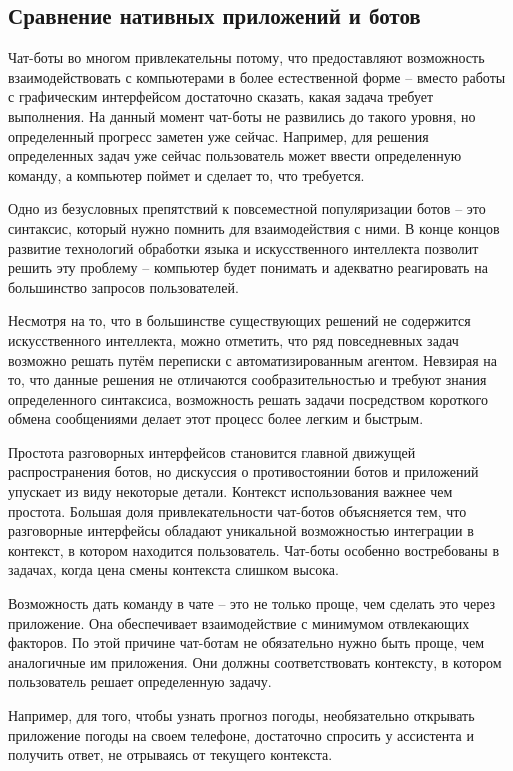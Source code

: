 \subsection{Сравнение нативных приложений и ботов} 
\label{sec:analysis:botsvsnative}

Чат-боты во многом привлекательны потому, что предоставляют возможность взаимодействовать с компьютерами в более естественной \linebreak форме -- вместо работы с графическим интерфейсом достаточно сказать, какая задача требует выполнения. На данный момент чат-боты не развились до такого уровня, но определенный прогресс заметен уже сейчас. Например, для решения определенных задач уже сейчас пользователь может ввести определенную команду, а компьютер поймет и сделает то, что требуется.

Одно из безусловных препятствий к повсеместной популяризации ботов -- это синтаксис, который нужно помнить для взаимодействия с ними. В конце концов развитие технологий обработки языка и искусственного интеллекта позволит решить эту проблему -- компьютер будет понимать и адекватно реагировать на большинство запросов пользователей.

Несмотря на то, что в большинстве существующих решений не содержится искусственного интеллекта, можно отметить, что ряд повседневных задач возможно решать путём переписки с автоматизированным агентом. Невзирая на то, что данные решения не отличаются сообразительностью и требуют знания определенного синтаксиса, возможность решать задачи посредством короткого обмена сообщениями делает этот процесс более легким и быстрым.

Простота разговорных интерфейсов становится главной движущей распространения ботов, но дискуссия о противостоянии ботов и приложений упускает из виду некоторые детали. Контекст использования важнее чем простота. Большая доля привлекательности чат-ботов объясняется тем, что разговорные интерфейсы обладают уникальной возможностью интеграции в контекст, в котором находится пользователь. Чат-боты особенно востребованы в задачах, когда цена смены контекста слишком высока.

Возможность дать команду в чате -- это не только проще, чем сделать это через приложение. Она обеспечивает взаимодействие с минимумом отвлекающих факторов. По этой причине чат-ботам не обязательно нужно быть проще, чем аналогичные им приложения. Они должны соответствовать контексту, в котором пользователь решает определенную задачу.

Например, для того, чтобы узнать прогноз погоды, необязательно открывать приложение погоды на своем телефоне, достаточно спросить у ассистента и получить ответ, не отрываясь от текущего контекста.

